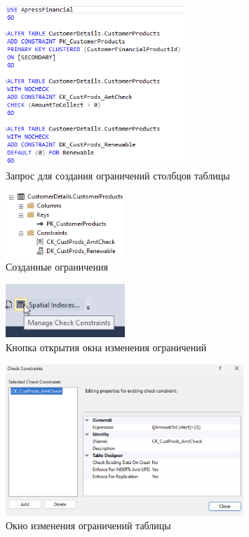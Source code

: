 \documentclass[a4paper, 14pt]{extarticle}
\begin{document}
\begin{figure}[H]
  \centering
  \includegraphics[width=0.6\textwidth]{images/task-1/13.png}
  \caption{Запрос для создания ограничений столбцов таблицы}
  \label{fig:task-1-13}
\end{figure}

\begin{figure}[H]
  \centering
  \includegraphics[width=0.4\textwidth]{images/task-1/14.png}
  \caption{Созданные ограничения}
  \label{fig:task-1-14}
\end{figure}

\begin{figure}[H]
  \centering
  \includegraphics[width=0.4\textwidth]{images/task-1/15.png}
  \caption{Кнопка открытия окна изменения ограничений}
  \label{fig:task-1-15}
\end{figure}

\begin{figure}[H]
  \centering
  \includegraphics[width=0.8\textwidth]{images/task-1/16.png}
  \caption{Окно изменения ограничений таблицы}
  \label{fig:task-1-16}
\end{figure}
\end{document}
